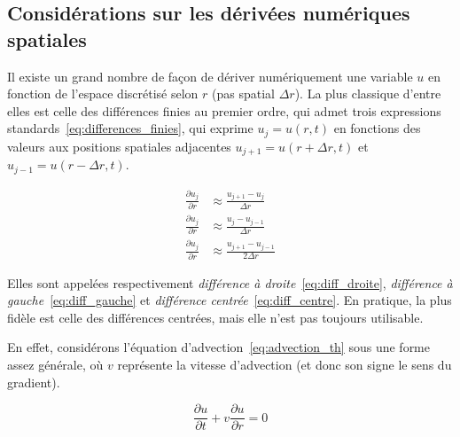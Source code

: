 
\subsection{Considérations sur les dérivées numériques spatiales}


Il existe un grand nombre de façon de dériver numériquement une variable $u$ en
fonction de l’espace discrétisé selon $r$ (pas spatial $\Delta{r}$). La plus
classique d’entre elles est celle des différences finies au premier ordre, qui
admet trois expressions standards~\eqref{eq:differences_finies}, qui exprime
$u_j = u(r,t)$ en fonctions des valeurs aux positions spatiales adjacentes
$u_{j+1} = u(r+\Delta{r},t)$ et $u_{j-1} = u(r-\Delta{r},t)$.

\begin{subequations}
    \label{eq:differences_finies}
    \begin{align}
        \label{eq:diff_droite}
        \frac{\partial u_j}{\partial r} &\approx \frac{u_{j+1} - u_j    }{  \Delta{r}}\\
        \label{eq:diff_gauche}
        \frac{\partial u_j}{\partial r} &\approx \frac{u_j     - u_{j-1}}{  \Delta{r}}\\
        \label{eq:diff_centre}
        \frac{\partial u_j}{\partial r} &\approx \frac{u_{j+1} - u_{j-1}}{2 \Delta{r}}
    \end{align}
\end{subequations}

Elles sont appelées respectivement \textit{différence à
droite}~\eqref{eq:diff_droite}, \textit{différence à
gauche}~\eqref{eq:diff_gauche} et \textit{différence
centrée}~\eqref{eq:diff_centre}. En pratique, la plus fidèle est celle des
différences centrées, mais elle n’est pas toujours utilisable.

En effet, considérons l’équation d’advection~\eqref{eq:advection_th} sous une
forme assez générale, où $v$ représente la vitesse d’advection (et donc son
signe le sens du gradient). 

\begin{equation}
    \label{eq:advection_th}
    \frac{\partial u}{\partial t} + v \frac{\partial u}{\partial r} = 0
\end{equation}

